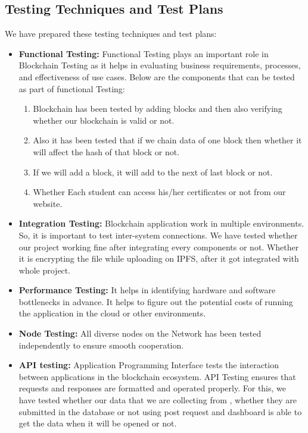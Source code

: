 \subsection{Testing Techniques and Test Plans}
We have prepared these testing techniques and test plans:
\begin{itemize}
    
    \item \textbf{Functional Testing:} Functional Testing plays an important role in Blockchain Testing as it helps in evaluating business requirements, processes, and effectiveness of use cases. Below are the components that can be tested as part of functional Testing:
    \begin{enumerate}
        \item Blockchain has been tested by adding blocks and then also verifying whether our blockchain is valid or not. 
        \item Also it has been tested that if we chain data of one block then whether it will affect the hash of that block or not.
        \item If we will add a block, it will add to the next of last block or not. 
        \item Whether Each student can access his/her certificates or not from our website.
    \end{enumerate}
    \item \textbf{Integration Testing:} Blockchain application work in multiple environments. So, it is important to test inter-system connections. We have tested whether our project working fine after integrating every components or not. Whether it is encrypting the file while uploading on IPFS, after it got integrated with whole project.
    
    \item \textbf{Performance Testing: } It helps in identifying hardware and software bottlenecks in advance. It helps to figure out the potential costs of running the application in the cloud or other environments.
    \item \textbf{Node Testing: }All diverse nodes on the Network has been tested independently to ensure smooth cooperation. 
    \item \textbf{API testing: } Application Programming Interface tests the interaction between applications in the blockchain ecosystem. API Testing ensures that requests and responses are formatted and operated properly. For this, we have tested whether our data that we are collecting from  , whether they are submitted in the database or not using post request and dashboard is able to get the data when it will be opened or not.
\end{itemize}




